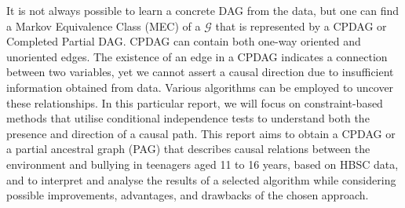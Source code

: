 It is not always possible to learn a concrete DAG from the data, but one can find a Markov Equivalence Class (MEC) of a $\mathcal{G}$ that is represented by a CPDAG or Completed Partial DAG. CPDAG can contain both one-way oriented and unoriented edges. The existence of an edge in a CPDAG indicates a connection between two variables, yet we cannot assert a causal direction due to insufficient information obtained from data. Various algorithms can be employed to uncover these relationships. In this particular report, we will focus on constraint-based methods that utilise conditional independence tests to understand both the presence and direction of a causal path. This report aims to obtain a CPDAG or a partial ancestral graph (PAG) that describes causal relations between the environment and bullying in teenagers aged 11 to 16 years, based on HBSC data, and to interpret and analyse the results of a selected algorithm while considering possible improvements, advantages, and drawbacks of the chosen approach. 



